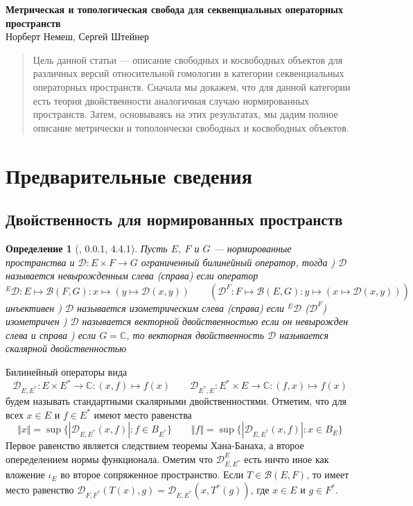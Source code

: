 \documentclass[12pt]{article}
\newtheorem{definition}[theorem]{Определение}
\begin{document}
\begin{center}

\Large \textbf{Метрическая и топологическая свобода для секвенциальных операторных пространств}\\[0.5cm]
\small {Норберт Немеш, Сергей Штейнер}\\[0.5cm]

\end{center}
\thispagestyle{empty}

\begin{abstract}
Цель данной статьи --- описание свободных и косвободных объектов для различных версий относительной гомологии в категории секвенциальных операторных пространств. Сначала мы докажем, что для данной категории есть теория двойственности аналогичная случаю нормированных пространств. Затем, основываясь на этих результатах, мы дадим полное описание метрически и тополоически свободных и косвободных объектов.
\end{abstract}


\section{Предварительные сведения}

\subsection{Двойственность для нормированных пространств}

\begin{definition}[\cite{HelQFA}, 0.0.1, 4.4.1]\label{DefDuality}
Пусть $E$, $F$ и $G$ --- нормированные пространства и $\mathcal{D}:E\times F\to G$ ограниченный билинейный оператор, тогда
) $\mathcal{D}$ называется невырожденным слева (справа) если оператор
$$
{}^E\mathcal{D}:E\mapsto\mathcal{B}(F,G):x\mapsto(y\mapsto\mathcal{D}(x,y))\qquad
(\mathcal{D}^F:F\mapsto\mathcal{B}(E,G):y\mapsto(x\mapsto\mathcal{D}(x,y)))
$$ 
инъективен
) $\mathcal{D}$ называется изометрическим слева (справа) если ${}^E\mathcal{D}$ ($\mathcal{D}^F$)  изометричен
) $\mathcal{D}$ называется векторной двойственностью если он невырожден слева и справа
) если $G=\mathbb{C}$, то векторная двойственность $\mathcal{D}$ называется скалярной двойственностью
\end{definition}
Билинейный операторы вида
$$
\mathcal{D}_{E,E^*}:E\times E^*\to\mathbb{C}:(x,f)\mapsto f(x)
\qquad
\mathcal{D}_{E^*,E}:E^*\times E\to\mathbb{C}:(f,x)\mapsto f(x)
$$будем называть стандартными скалярными двойственностями. Отметим, что для всех $x\in E$ и $f\in E^*$ имеют место равенства
$$
\Vert x\Vert=\sup\{|\mathcal{D}_{E,E^*}(x,f)|:f\in B_{E^*}\}
\qquad
\Vert f\Vert=\sup\{|\mathcal{D}_{E,E^*}(x,f)|:x\in  B_E\}
$$
Первое равенство является следствием теоремы Хана-Банаха, а второе опеределением нормы функционала. Ометим что $\mathcal{D}_{E,E^*}^E$ есть ничто иное как вложение $\iota_E$ во второе сопряженное пространство.
Если $T\in \mathcal{B}(E,F)$, то имеет место равенство $\mathcal{D}_{F,F^*}(T(x),g)=\mathcal{D}_{E,E^*}(x,T^*(g))$, где $x\in E$ и $g\in F^*$. 
\end{document}
